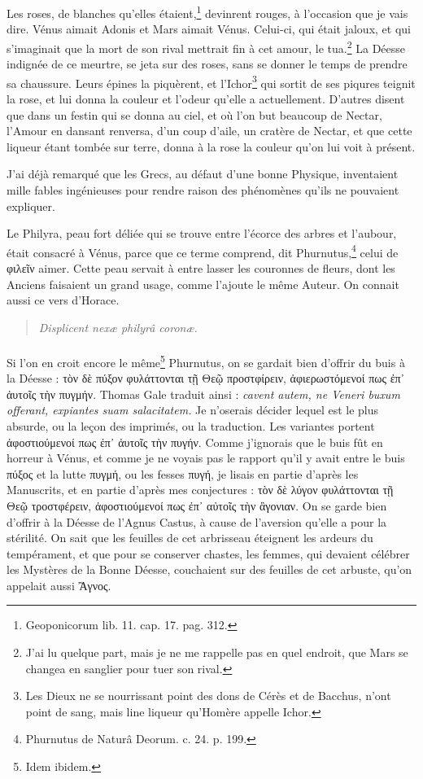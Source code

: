 \documentclass[a4paper, 11pt, oneside, polutonikogreek, french]{article}
\begin{document}
Les roses, de blanches qu'elles étaient,\footnote{Geoponicorum lib. 11. cap. 17. pag. 312.} devinrent rouges, à l'occasion que je vais dire. Vénus aimait Adonis et Mars aimait Vénus. Celui-ci, qui était jaloux, et qui s'imaginait que la mort de son rival mettrait fin à cet amour, le tua.\footnote{J'ai lu quelque part, mais je ne me rappelle pas en quel endroit, que Mars se changea en sanglier pour tuer son rival.} La Déesse indignée de ce meurtre, se jeta sur des roses, sans se donner le temps de prendre sa chaussure. Leurs épines la piquèrent, et l'Ichor\footnote{Les Dieux ne se nourrissant point des dons de Cérès et de Bacchus, n'ont point de sang, mais line liqueur qu'Homère appelle Ichor.} qui sortit de ses piqures teignit la rose, et lui donna la couleur et l'odeur qu'elle a actuellement. D'autres disent que dans un festin qui se donna au ciel, et où l'on but beaucoup de Nectar, l'Amour en dansant renversa, d'un coup d'aile, un cratère de Nectar, et que cette liqueur étant tombée sur terre, donna à la rose la couleur qu'on lui voit à présent.

J'ai déjà remarqué que les Grecs, au défaut d'une bonne Physique, inventaient mille fables ingénieuses pour rendre raison des phénomènes qu'ils ne pouvaient expliquer.

Le Philyra, peau fort déliée qui se trouve entre l'écorce des arbres et l'aubour, était consacré à Vénus, parce que ce terme comprend, dit Phurnutus,\footnote{Phurnutus de Naturâ Deorum. c. 24. p. 199.} celui de φιλεῖν aimer. Cette peau servait à entre lasser les couronnes de fleurs, dont les Anciens faisaient un grand usage, comme l'ajoute le même Auteur. On connait aussi ce vers d'Horace.
\begin{quotation}
\emph{Displicent nexæ philyrâ coronæ.}
\end{quotation}
\paragraph{}
Si l'on en croit encore le même\footnote{Idem ibidem.} Phurnutus, on se gardait bien d'offrir du buis à la Déesse : τὸν δὲ πύξον φυλάττονται τῇ Θεῷ προστφίρειν, ἀφιερωστόμενοί πως ἐπ᾽ ἀυτοῖς τὴν πυγμήν. Thomas Gale traduit ainsi : \emph{cavent autem, ne Veneri buxum offerant, expiantes suam salacitatem.} Je n'oserais décider lequel est le plus absurde, ou la leçon des imprimés, ou la traduction. Les variantes portent ἀφοστιούμενοί πως ἐπ᾿ ἀυτοῖς τὴν πυγήν. Comme j'ignorais que le buis fût en horreur à Vénus, et comme je ne voyais pas le rapport qu'il y avait entre le buis πύξος et la lutte πυγμή, ou les fesses πυγή, je lisais en partie d'après les Manuscrits, et en partie d'après mes conjectures : τὸν δὲ λύγον φυλάττονται τῇ Θεῷ τροστφέρειν, ἀφοστιούμενοί πως ἐπ᾿ αὐτοῖς τὴν ἂγονιαν. On se garde bien d'offrir à la Déesse de l'Agnus Castus, à cause de l'aversion qu'elle a pour la stérilité. On sait que les feuilles de cet arbrisseau éteignent les ardeurs du tempérament, et que pour se conserver chastes, les femmes, qui devaient célébrer les Mystères de la Bonne Déesse, couchaient sur des feuilles de cet arbuste, qu'on appelait aussi Ἂγνος.
\end{document}
